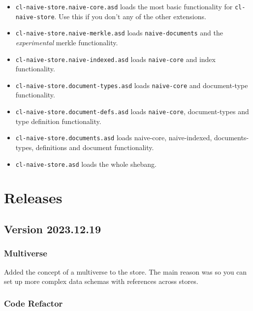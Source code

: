 \documentclass[11pt]{article}
\begin{document}
\begin{itemize}
\item \texttt{cl-naive-store.naive-core.asd} loads the most basic functionality for
\texttt{cl-naive-store}. Use this if you don't any of the other extensions.

\item \texttt{cl-naive-store.naive-merkle.asd} loads \texttt{naive-documents} and the
\emph{experimental} merkle functionality.

\item \texttt{cl-naive-store.naive-indexed.asd} loads \texttt{naive-core} and index
functionality.

\item \texttt{cl-naive-store.document-types.asd} loads \texttt{naive-core} and document-type
functionality.

\item \texttt{cl-naive-store.document-defs.asd} loads \texttt{naive-core}, document-types
and type definition functionality.

\item \texttt{cl-naive-store.documents.asd} loads naive-core, naive-indexed,
documents-types, definitions and document functionality.

\item \texttt{cl-naive-store.asd} loads the whole shebang.
\end{itemize}


\section{Releases}
\label{sec:org7428f5a}

\subsection{Version 2023.12.19}
\label{sec:org83c7c91}

\subsubsection{Multiverse}
\label{sec:org3082203}

Added the concept of a multiverse to the store. The main reason was so
you can set up more complex data schemas with references across
stores.

\subsubsection{Code Refactor}
\label{sec:org2ea96e5}
\end{document}
